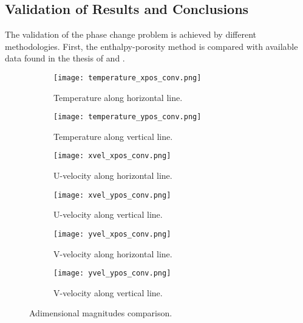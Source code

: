\subsection{Validation of Results and Conclusions}
The validation of the phase change problem is achieved by different methodologies. First, the enthalpy-porosity method is compared with available data found in the thesis of \cite{bourdillon_2016} and \cite{kowalewski_rebow_1999}. 

\begin{figure}[h!]
	\begin{subfigure}{0.50\textwidth}
		\centering
		\texttt{[image: temperature\_xpos\_conv.png]}\hfill
		\caption{Temperature along horizontal line.} \label{3.4afig}
	\end{subfigure}
	\hfill
	\begin{subfigure}{0.50\textwidth}
		\centering
		\texttt{[image: temperature\_ypos\_conv.png]}	
		\caption{Temperature along vertical line.}\label{3.4bfig}
	\end{subfigure}
	\begin{subfigure}{0.50\textwidth}
		\texttt{[image: xvel\_xpos\_conv.png]}\hfill
		\caption{U-velocity along horizontal line.}\label{3.4cfig}
	\end{subfigure}
	\begin{subfigure}{0.50\textwidth}
		\texttt{[image: xvel\_ypos\_conv.png]}	
		\caption{U-velocity along vertical line.}\label{3.4dfig}
	\end{subfigure}
	\begin{subfigure}{0.50\textwidth}
		\texttt{[image: yvel\_xpos\_conv.png]}\hfill	
		\caption{V-velocity along horizontal line.}\label{3.4efig}
	\end{subfigure}
	\begin{subfigure}{0.50\textwidth}
		\texttt{[image: yvel\_ypos\_conv.png]}	
		\caption{V-velocity along vertical line.}\label{3.4ffig}
	\end{subfigure}
	\caption{Adimensional magnitudes comparison.}
	\label{3.4fig}
\end{figure} 




